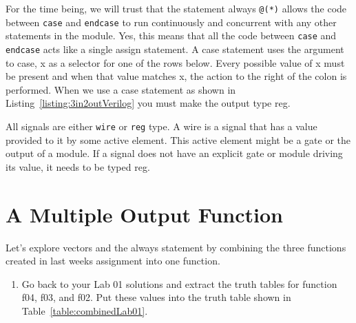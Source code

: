 For the time being, we will trust that the statement always \verb+@(*)+ allows
the code between \verb+case+ and \verb+endcase+ to run continuously and concurrent
with any other statements in the module. Yes, this means that all the
code between \verb+case+ and \verb+endcase+ acts like a single assign statement. A
case statement uses the argument to case, x as a selector
for one of the rows below. Every possible value of x must be present and
when that value matches x, the action to the right of the colon is
performed. When we use a case statement as shown in Listing~\ref{listing:3in2outVerilog}
you must make the output type reg.

All signals are either \verb+wire+ or \verb+reg+ type. A wire is a signal that has a
value provided to it by some active element. This active element might
be a gate or the output of a module. If a signal does not have an
explicit gate or module driving its value, it needs to be typed reg.

\hypertarget{part-1-combine-lab-1-functions.}{%
\section{A Multiple Output Function}\label{part-1-combine-lab-1-functions.}}

Let's explore vectors and the always statement by combining the three
functions created in last weeks assignment into one function.

\begin{enumerate}
        \def\labelenumi{\arabic{enumi}.}
    \item
        Go back to your Lab 01 solutions and extract the truth tables for
        function f04, f03, and f02. Put these values into the truth table
        shown in Table~\ref{table:combinedLab01}.
\end{enumerate}

